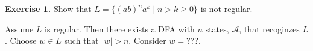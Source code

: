 \documentclass{article}
\begin{document}
 

\textbf{Exercise 1.}  Show that $L = \{(ab)^na^k \mid n > k \geq 0 \}$ is not regular.

Assume $L$ is regular.  Then there exists a DFA with $n$ states, $\mathcal{A}$, that recoginzes $L$.  Choose $w \in L$ such that $|w| > n$. Consider $w = ???$.
\end{document}
